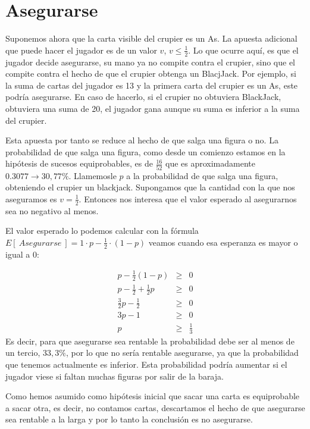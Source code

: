 \documentclass[12pt,a4paper,]{book}
\numberwithin{dummy}{section}
\theoremstyle{ocrenumbox}
\theoremstyle{blacknumex}
\theoremstyle{blacknumbox}
\theoremstyle{ocrenum}
\theoremstyle{ocrenum}
\begin{document}
\hypertarget{Seccion45}{%
\section{Asegurarse}\label{Seccion45}}

Suponemos ahora que la carta visible del crupier es un As. La apuesta
adicional que puede hacer el jugador es de un valor \(v\),
\(v \leq \frac{1}{2}\). Lo que ocurre aquí, es que el jugador decide
asegurarse, su mano ya no compite contra el crupier, sino que el compite
contra el hecho de que el crupier obtenga un BlacjJack. Por ejemplo, si
la suma de cartas del jugador es 13 y la primera carta del crupier es un
As, este podría asegurarse. En caso de hacerlo, si el crupier no
obtuviera BlackJack, obtuviera una suma de 20, el jugador gana aunque su
suma es inferior a la suma del crupier.

Esta apuesta por tanto se reduce al hecho de que salga una figura o no.
La probabilidad de que salga una figura, como desde un comienzo estamos
en la hipótesis de sucesos equiprobables, es de \(\frac{16}{52}\) que es
aproximadamente \(0.3077 \rightarrow 30,77 \%\). Llamemosle \(p\) a la
probabilidad de que salga una figura, obteniendo el crupier un
blackjack. Supongamos que la cantidad con la que nos aseguramos es
\(v=\frac{1}{2}\). Entonces nos interesa que el valor esperado al
asegurarnos sea no negativo al menos.

El valor esperado lo podemos calcular con la fórmula
\(E[ \ Asegurarse \ ]= 1·p - \frac{1}{2}·(1-p)\) veamos cuando esa
esperanza es mayor o igual a 0:

\[
\begin{array}{ccl}
p - \frac{1}{2}(1-p)& \geq  & 0 \\
p - \frac{1}{2} +\frac{1}{2}p& \geq  & 0\\
\frac{3}{2}p - \frac{1}{2} & \geq  & 0\\
3p - 1& \geq  & 0 \\
p & \geq & \frac{1}{3}
\end{array}
\] Es decir, para que asegurarse sea rentable la probabilidad debe ser
al menos de un tercio, \(33,3 \%\), por lo que no sería rentable
asegurarse, ya que la probabilidad que tenemos actualmente es inferior.
Esta probabilidad podría aumentar si el jugador viese si faltan muchas
figuras por salir de la baraja.

Como hemos asumido como hipótesis inicial que sacar una carta es
equiprobable a sacar otra, es decir, no contamos cartas, descartamos el
hecho de que asegurarse sea rentable a la larga y por lo tanto la
conclusión es no asegurarse.
\end{document}
